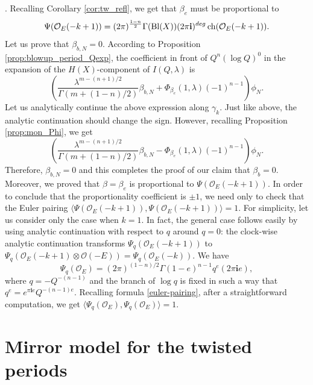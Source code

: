 \documentclass[10pt,a4paper]{article}
\numberwithin{equation}{section}
\newcommand{\leftexp}[2]{{\vphantom{#2}}^{#1}{#2}}
\newcommand{\ii}{\mathbf{i}}
\renewcommand{\O}{\mathcal{O}}
\begin{document}
\smash{$\leftexp{tw}{I}^{(-m)}_{-\beta_e}(1,\lambda)$}. Recalling Corollary \ref{cor:tw_refl}, we get that $\beta_e$ must be proportional to
\[
\Psi(\O_E(-k+1))=
(2\pi)^{\frac{1-n}{2}} \Gamma(\operatorname{Bl}(X)) (2\pi\ii)^{\rm deg}
\operatorname{ch}(\O_E(-k+1)).
\]
Let us prove that $\beta_{b,N}=0$.
According to Proposition \ref{prop:blowup_period_Qexp}, the coefficient in front of $Q^n (\log Q)^0$ in the expansion of the $H(X)$-component of $I(Q,\lambda)$ is
\[
\left( \frac{\lambda^{m-(n+1)/2}}{\Gamma(m+(1-n)/2)} \beta_{b,N} +
\Phi_{\beta_e}(1,\lambda) (-1)^{n-1} \right) \phi_N.
\]
Let us analytically continue the above expression along $\gamma_k$. Just like above, the analytic continuation should change the sign. However, recalling Proposition \ref{prop:mon_Phi}, we get
\[
\left( \frac{\lambda^{m-(n+1)/2}}{\Gamma(m+(1-n)/2)} \beta_{b,N} -
\Phi_{\beta_e}(1,\lambda) (-1)^{n-1} \right) \phi_N.
\]
Therefore, $\beta_{b,N}=0$ and this completes the proof of our claim that $\beta_b=0$. Moreover, we proved that $\beta=\beta_e$ is proportional to $\Psi(\O_E(-k+1))$. In order to conclude that the proportionality coefficient is $\pm 1$, we need only to check that the Euler pairing
${\langle \Psi(\O_E(-k+1)), \Psi(\O_E(-k+1))\rangle =1}$. For simplicity, let us consider only the case when $k=1$. In fact, the general case follows easily by using analytic continuation with respect to $q$ around $q=0$: the clock-wise analytic continuation transforms $\Psi_q(\O_E(-k+1))$ to $\Psi_q(\O_E(-k+1)\otimes \O(-E))=\Psi_q(\O_E(-k))$. We have
\[
\Psi_q(\O_E)=
(2\pi)^{(1-n)/2}
\Gamma(1-e)^{n-1}
q^{e} (2\pi \ii e),
\]
where $q=-Q^{-(n-1)}$ and the branch of $\log q$ is fixed in such a way that $q^{e}= e^{\pi\ii e} Q^{-(n-1)e}$. Recalling formula \eqref{euler-pairing}, after a straightforward computation, we get $\langle\Psi_q(\O_E),\Psi_q(\O_E)\rangle=1$.

\section{Mirror model for the twisted periods}\label{sec:mirror}
\end{document}
